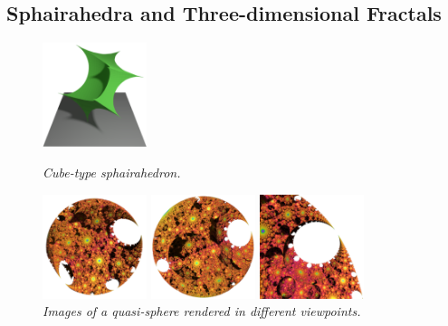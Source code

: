 \subsection{Sphairahedra and Three-dimensional Fractals}

\begin{figure}[h!tbp]
  \begin{minipage}[t]{0.25\textwidth}
   \centering
   \includegraphics[height=1.2in, keepaspectratio]{./img/application/sphairahedron/cube.png}
   \caption{\textit{Cube-type sphairahedron.}}
   \label{fig:cubeSphaira}
  \end{minipage}
  \hspace*{\fill}
 \begin{minipage}[t]{0.75\textwidth}
  \begin{minipage}[t]{0.25\textwidth}
   \centering
   \includegraphics[height=1.2in,
   keepaspectratio]{./img/application/sphairahedron/quasi-sphere.png}
   \subcaption{}
  \end{minipage}
  \hspace*{\fill}
  \begin{minipage}[t]{0.25\textwidth}
   \centering
   \includegraphics[height=1.2in,
   keepaspectratio]{./img/application/sphairahedron/other.png}
   \subcaption{}
  \end{minipage}
  \hspace*{\fill}
  \begin{minipage}[t]{0.25\textwidth}
   \centering
   \includegraphics[height=1.2in,
   keepaspectratio]{./img/application/sphairahedron/quasi-sphereZoom.png}
   \subcaption{}
  \end{minipage}
  \hspace*{\fill}
  \caption{\textit{Images of a quasi-sphere rendered in different viewpoints.}}
  \label{fig:quasi-sphere}
 \end{minipage}
\end{figure}


